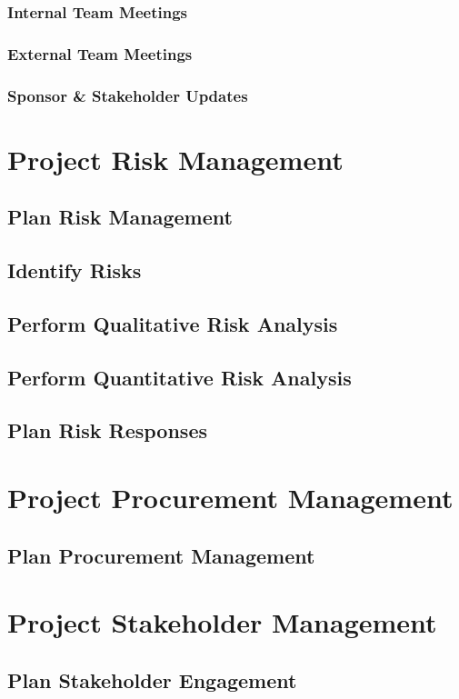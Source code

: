 \documentclass[12pt,letterpaper]{report}
\begin{document}
	\subsection{Internal Team Meetings}
	\subsection{External Team Meetings}
	\subsection{Sponsor \& Stakeholder Updates}
	
	\chapter{Project Risk Management}
	\section{Plan Risk Management}
	\section{Identify Risks}
	\section{Perform Qualitative Risk Analysis}
	\section{Perform Quantitative Risk Analysis}
	\section{Plan Risk Responses}
	\chapter{Project Procurement Management}
	\section{Plan Procurement Management}
	\chapter{Project Stakeholder Management}
	\section{Plan Stakeholder Engagement}
	
\end{document}
